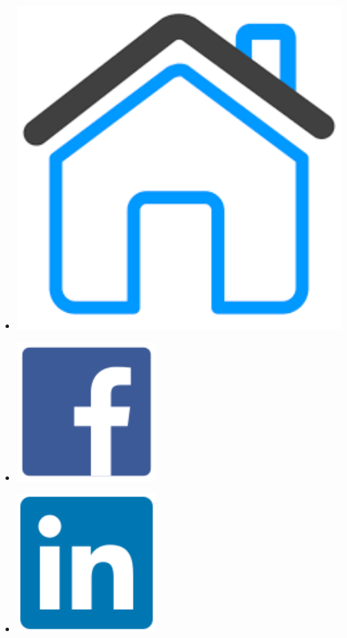 \documentclass[a4paper,oneside,10pt]{article}
\begin{document}
\begin{multicols}{10}
\begin{itemize}

\item[]\href{https://iosang.github.io}{\includegraphics[scale=0.08]{assets/home.pdf}}

\item[]\href{https://www.facebook.com/metimdjai}{\includegraphics[scale=0.2]{assets/facebook-original.pdf}}

\item[]\href{https://www.linkedin.com/in/iosif-angelidis/}{\includegraphics[scale=0.2]{assets/linkedin-original.pdf}}


\end{itemize}
\end{multicols}
\end{document}
